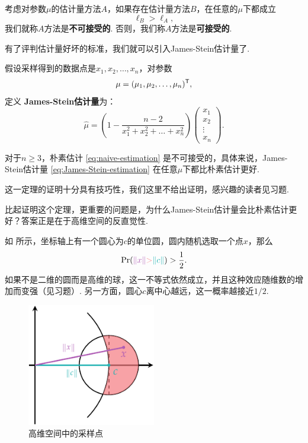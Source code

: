 \begin{definition}[可接受性]
考虑对参数$\mu$的估计量方法$A$，如果存在估计量方法$B$，在任意的$\mu$下都成立
\[\ell_B > \ell_A,\]
我们就称$A$方法是\textbf{不可接受的}. 否则，我们称$A$方法是\textbf{可接受的}. 
\end{definition}

有了评判估计量好坏的标准，我们就可以引入James-Stein估计量了. 

\begin{definition}
假设采样得到的数据点是$x_1,x_2,\dots,x_n$，对参数
\[\mu=(\mu_1,\mu_2,\dots,\mu_n)^{\mathsf{T}},\]
定义 \textbf{James-Stein估计量}为：
\begin{equation}
    \hat{\mu} = \left(1 - \frac{n-2}{x_1^2+x_2^2+\dots+x_n^2}\right)\begin{pmatrix}
        x_1 \\ x_2 \\ \vdots \\ x_n
        \end{pmatrix}.\label{eq:James-Stein-estimation}        
\end{equation}
\end{definition}

\begin{theorem}[Stein悖论]\label{thm:stein-paradox}
    对于$n\geq 3$，朴素估计 \eqref{eq:naive-estimation} 是不可接受的，具体来说，James-Stein估计量 \eqref{eq:James-Stein-estimation} 在任意$\mu$下都比朴素估计更好. 
\end{theorem}

这一定理的证明十分具有技巧性，我们这里不给出证明，感兴趣的读者见习题.

比起证明这个定理，更重要的问题是，为什么James-Stein估计量会比朴素估计更好？答案正是在于高维空间的反直觉性. 

如 所示，坐标轴上有一个圆心为$c$的单位圆，圆内随机选取一个点$x$，那么
\[
\Pr(\light{\norm{x}} \textcolor{Salmon}{>} \contrastlight{\norm{c}}) > \frac{1}{2}.
\]
如果不是二维的圆而是高维的球，这一不等式依然成立，并且这种效应随维数的增加而变强（见习题）. 另一方面，圆心$c$离中心越远，这一概率越接近$1/2$. 

\begin{figure}[ht]
    \centering
    \includegraphics[width=0.5\textwidth]{figures/J-L-lemma/stein.pdf}
    \caption{高维空间中的采样点}
    \label{fig:circle-sample}
\end{figure}

